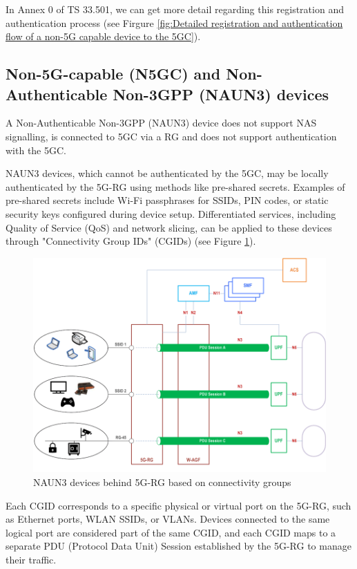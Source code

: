 In Annex 0 of TS 33.501, we can get more detail regarding this registration and authentication process (see Firgure \ref{fig:Detailed registration and authentication flow of a non-5G capable device to the 5GC}).

\subsection{Non-5G-capable (N5GC) and Non-Authenticable Non-3GPP (NAUN3) devices}

A Non-Authenticable Non-3GPP (NAUN3) device does not support \ac{NAS} signalling, is connected to 5GC via a RG and does not support authentication with the 5GC.%

NAUN3 devices, which cannot be authenticated by the 5GC, may be locally authenticated by the 5G-RG using methods like pre-shared secrets. Examples of pre-shared secrets include Wi-Fi passphrases for SSIDs, PIN codes, or static security keys configured during device setup. Differentiated services, including Quality of Service (QoS) and network slicing, can be applied to these devices through "Connectivity Group IDs" (CGIDs) (see Figure \ref{fig:NAUN3 devices behind 5G-RG based on connectivity groups}).

\begin{figure}
    \centering
    \includegraphics[width=0.75\linewidth]{figs/NAUN3 devices behind 5G-RG based on connectivity groups.png}
    \caption{NAUN3 devices behind 5G-RG based on connectivity groups}
    \label{fig:NAUN3 devices behind 5G-RG based on connectivity groups}
\end{figure}

Each CGID corresponds to a specific physical or virtual port on the 5G-RG, such as Ethernet ports, WLAN SSIDs, or VLANs. Devices connected to the same logical port are considered part of the same CGID, and each CGID maps to a separate PDU (Protocol Data Unit) Session established by the 5G-RG to manage their traffic.

